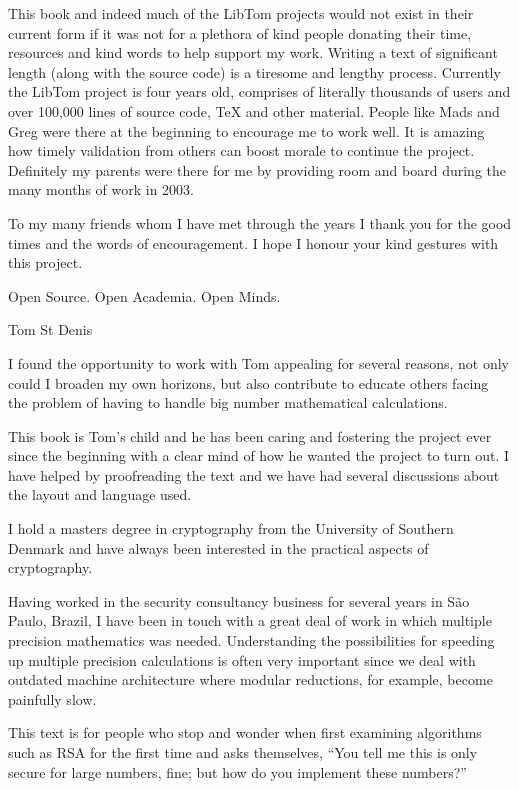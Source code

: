 \documentclass[b5paper]{book}
\begin{document}
This book and indeed much of the LibTom projects would not exist in their current form if it was not for a plethora
of kind people donating their time, resources and kind words to help support my work.  Writing a text of significant
length (along with the source code) is a tiresome and lengthy process.  Currently the LibTom project is four years old,
comprises of literally thousands of users and over 100,000 lines of source code, TeX and other material.  People like Mads and Greg 
were there at the beginning to encourage me to work well.  It is amazing how timely validation from others can boost morale to 
continue the project. Definitely my parents were there for me by providing room and board during the many months of work in 2003.  

To my many friends whom I have met through the years I thank you for the good times and the words of encouragement.  I hope I
honour your kind gestures with this project.

Open Source.  Open Academia.  Open Minds.

\begin{flushright} Tom St Denis \end{flushright}

\newpage
I found the opportunity to work with Tom appealing for several reasons, not only could I broaden my own horizons, but also 
contribute to educate others facing the problem of having to handle big number mathematical calculations.

This book is Tom's child and he has been caring and fostering the project ever since the beginning with a clear mind of 
how he wanted the project to turn out. I have helped by proofreading the text and we have had several discussions about 
the layout and language used.

I hold a masters degree in cryptography from the University of Southern Denmark and have always been interested in the 
practical aspects of cryptography. 

Having worked in the security consultancy business for several years in S\~{a}o Paulo, Brazil, I have been in touch with a 
great deal of work in which multiple precision mathematics was needed. Understanding the possibilities for speeding up 
multiple precision calculations is often very important since we deal with outdated machine architecture where modular 
reductions, for example, become painfully slow.

This text is for people who stop and wonder when first examining algorithms such as RSA for the first time and asks 
themselves, ``You tell me this is only secure for large numbers, fine; but how do you implement these numbers?''
\end{document}
